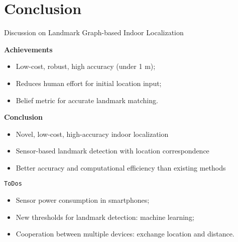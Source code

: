 \section{Conclusion}

\begin{frame}{Discussion on Landmark Graph-based Indoor Localization}
    
    \textbf{Achievements}
    \begin{itemize}
        \item Low-cost, robust, high accuracy (under 1 m);
        \item Reduces human effort for initial location input;
        \item Belief metric for accurate landmark matching.
    \end{itemize}
    
    \textbf{Conclusion}
    \begin{itemize}
        \item Novel, low-cost, high-accuracy indoor localization
        \item Sensor-based landmark detection with location correspondence
        \item Better accuracy and computational efficiency than existing methods
    \end{itemize}

    \texttt{ToDos}
    \begin{itemize}
        \item Sensor power consumption in smartphones;
        \item New thresholds for landmark detection: machine learning;
        \item Cooperation between multiple devices: exchange location and distance.
    \end{itemize}
    
\end{frame}